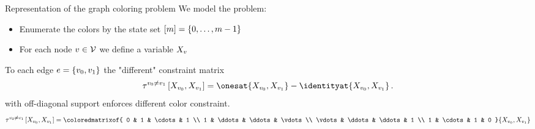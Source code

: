 \documentclass{beamer}
\begin{document}
    \begin{frame}{Representation of the graph coloring problem}
        We model the problem:
        \begin{itemize}
            \item Enumerate the colors by the state set $[m]=\{0,\ldots,m-1\}$
            \item For each node $v\in\mathcal{V}$ we define a variable $X_{v}$
        \end{itemize}
        To each edge $e=\{v_{0},v_{1}\}$ the "different" constraint matrix
        \begin{align*}
            \hypercoreofat{\node_0\neq\node_1}{\catvariableof{\node_{0}},\catvariableof{\node_{1}}}
            = \onesat{\catvariableof{\node_{0}},\catvariableof{\node_{1}}} - \identityat{\catvariableof{\node_{0}},\catvariableof{\node_{1}}} \, .
        \end{align*}
        with off-diagonal support enforces different color constraint.
        \begin{align*}
            \hypercoreofat{\nodeof{0}\neq\nodeof{1}}{\catvariableof{\nodeof{0}},\catvariableof{\nodeof{1}}}
            =\coloredmatrixof{
                0 & 1 & \cdots & 1  \\
                1 & \ddots & \ddots & \vdots \\
                \vdots & \ddots & \ddots & 1 \\
                1 & \cdots & 1 & 0
            }{\catvariableof{\nodeof{0}},\catvariableof{\nodeof{1}}}
        \end{align*}
    \end{frame}
\end{document}
